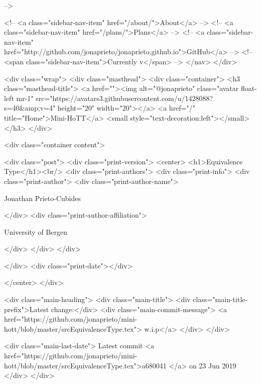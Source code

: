       
     -->

    <!-- <a class="sidebar-nav-item" href="/about/">About</a> -->
    <!-- <a class="sidebar-nav-item" href="/plans/">Plans</a> -->
    <!-- <a class="sidebar-nav-item" href="http://github.com/jonaprieto/jonaprieto.github.io">GitHub</a> -->
    <!-- <span class="sidebar-nav-item">Currently v</span> -->
  </nav>
</div>

    <div class="wrap">
      <div class="masthead">
        <div class="container">
          <h3 class="masthead-title">
            <a href=""><img alt="@jonaprieto" class="avatar float-left mr-1" src="https://avatars3.githubusercontent.com/u/1428088?s=40&amp;v=4" height="20" width="20"></a>
            <a href="/" title="Home">Mini-HoTT</a>
            <small style="text-decoration:left"></small>
          </h3>
        </div>
      
      <div class="container content">
        







<div class="post">
  <div class="print-version">
    <center>
      <h1>Equivalence Type</h1><br/>
        <div class="print-authors">
          <div class="print-info">
            <div class="print-author">
              <div class="print-author-name">
                
                  Jonathan Prieto-Cubides
                
              </div>
              <div class="print-author-affiliation">
                
                  University of Bergen
                
                </div>
            </div>
          </div>
          
          
        </div>
        <div class="print-date"></div>
        
        
    </center>
  </div>

  
  <div class="main-heading">
    <div class="main-title">
      <div class="main-title-prefix">Latest change:</div>
      <div class="main-commit-message">
            <a href="https://github.com/jonaprieto/mini-hott/blob/master/srcEquivalenceType.tex">
              w.i.p</a>
      </div>
    </div>

    <div class="main-last-date">
      Latest commit <a href="https://github.com/jonaprieto/mini-hott/blob/master/srcEquivalenceType.tex">a680041 </a> on  23 Jun 2019
    </div>
  </div>
  

